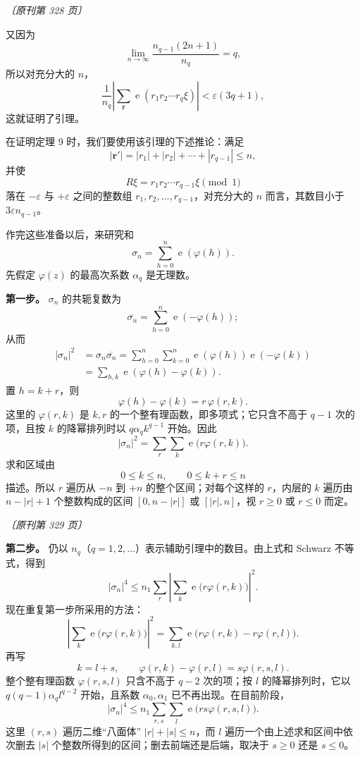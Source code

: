 \documentclass[UTF8,11pt,a4paper,fontset=none]{ctexart}
\theoremstyle{weylthm}
\newcommand{\e}{\operatorname{e}}
\newcommand{\origpage}[1]{%
  \par\vspace{0.7em}\noindent\hfill{\small\itshape〔原刊第 #1 页〕}\par\vspace{0.25em}}
\begin{document}
\origpage{328}

又因为
\[
 \lim_{n\to\infty}\frac{n_{q-1}(2n+1)}{n_q}=q,
\]
所以对充分大的 \(n\)，
\[
 \frac1{n_q}
 \left|\sum_{\mathbf r}\e(r_1r_2\cdots r_q\xi)\right|
 <\varepsilon(3q+1),
\]
这就证明了引理。

在证明定理 9 时，我们要使用该引理的下述推论：满足
\[
 |\mathbf r'|=|r_1|+|r_2|+\cdots+|r_{q-1}|\leq n,
\]
并使
\[
 R\xi=r_1r_2\cdots r_{q-1}\xi\pmod 1
\]
落在 \(-\varepsilon\) 与 \(+\varepsilon\) 之间的整数组
\(r_1,r_2,\ldots,r_{q-1}\)，对充分大的 \(n\) 而言，其数目小于
\(3\varepsilon n_{q-1}\)。

作完这些准备以后，来研究和
\[
 \sigma_n=\sum_{h=0}^{n}\e(\varphi(h)).
\]
先假定 \(\varphi(z)\) 的最高次系数 \(\alpha_q\) 是无理数。

\medskip
\noindent\textbf{第一步。}
\(\sigma_n\) 的共轭复数为
\[
 \overline{\sigma_n}=\sum_{h=0}^{n}\e(-\varphi(h));
\]
从而
\[
\begin{aligned}
 |\sigma_n|^2
 &=\sigma_n\overline{\sigma_n}
 =\sum_{h=0}^{n}\sum_{k=0}^{n}
   \e(\varphi(h))\e(-\varphi(k))\\
 &=\sum_{h,k}\e(\varphi(h)-\varphi(k)).
\end{aligned}
\]
置 \(h=k+r\)，则
\[
 \varphi(h)-\varphi(k)=r\,\varphi(r,k).
\]
这里的 \(\varphi(r,k)\) 是 \(k,r\) 的一个整有理函数，即多项式；它只含不高于 \(q-1\) 次的项，且按 \(k\) 的降幂排列时以
\(q\alpha_qk^{q-1}\) 开始。因此
\[
 |\sigma_n|^2=\sum_r\sum_k\e\bigl(r\varphi(r,k)\bigr).
\]
求和区域由
\[
 0\leq k\leq n,
 \qquad
 0\leq k+r\leq n
\]
描述。所以 \(r\) 遍历从 \(-n\) 到 \(+n\) 的整个区间；对每个这样的
\(r\)，内层的 \(k\) 遍历由 \(n-|r|+1\) 个整数构成的区间
\([0,n-|r|]\) 或 \([|r|,n]\)，视 \(r\geq0\) 或 \(r\leq0\) 而定。

\origpage{329}

\medskip
\noindent\textbf{第二步。}
仍以 \(n_q\)（\(q=1,2,\ldots\)）表示辅助引理中的数目。由上式和 Schwarz 不等式，得到
\[
 |\sigma_n|^4
 \leq n_1\sum_r
 \left|\sum_k\e\bigl(r\varphi(r,k)\bigr)\right|^2.
\]
现在重复第一步所采用的方法：
\[
 \left|\sum_k\e\bigl(r\varphi(r,k)\bigr)\right|^2
 =\sum_{k,l}\e\bigl(r\varphi(r,k)-r\varphi(r,l)\bigr).
\]
再写
\[
 k=l+s,
 \qquad
 \varphi(r,k)-\varphi(r,l)=s\varphi(r,s,l).
\]
整个整有理函数 \(\varphi(r,s,l)\) 只含不高于 \(q-2\) 次的项；按
\(l\) 的降幂排列时，它以
\(q(q-1)\alpha_ql^{q-2}\) 开始，且系数 \(\alpha_0,\alpha_1\) 已不再出现。在目前阶段，
\[
 |\sigma_n|^4
 \leq n_1\sum_{r,s}\sum_l
 \e\bigl(rs\varphi(r,s,l)\bigr).
\]
这里 \((r,s)\) 遍历二维“八面体”
\(|r|+|s|\leq n\)，而 \(l\) 遍历一个由上述求和区间中依次删去
\(|s|\) 个整数所得到的区间；删去前端还是后端，取决于
\(s\geq0\) 还是 \(s\leq0\)。
\end{document}
